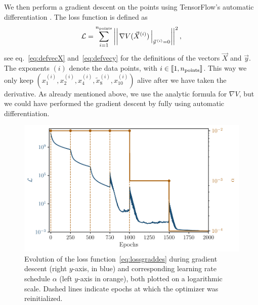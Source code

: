\documentclass[11pt,a4paper]{article}
\begin{document}
	We then perform a gradient descent on the points using TensorFlow’s automatic differentiation \cite{tensorflow2015-whitepaper}. The loss function is defined as
	\begin{equation} \label{eq:lossgraddes}
		\mathcal{L} = \sum_{i = 1}^{n_{\rm points}} \left|\left|\left.\nabla V(\vec{X}^{(i)})\,\right|_{\vec{y}^{\,(i)}=0}\right|\right|^2,
	\end{equation}
	see eq.~\eqref{eq:defvecX} and~\eqref{eq:defvecy} for the definitions of the vectors $\vec{X}$ and $\vec{y}$. The exponents $(i)$ denote the data points, with $i\in\llbracket1,n_{\rm points}\rrbracket$. This way we only keep $(x^{(i)}_1,x^{(i)}_2,x^{(i)}_4,\tilde{x}^{(i)}_8,x^{(i)}_{10})$ alive after we have taken the derivative. As already mentioned above, we use the analytic formula for $\nabla V$, but we could have performed the gradient descent by fully using automatic differentiation.

	\begin{figure}
		\centering
		\includegraphics[scale = 0.75]{Figures/Loss_grad_des_21_05_2025.pdf}
		\caption{Evolution of the loss function~\eqref{eq:lossgraddes} during gradient descent (right $y$-axis, in blue) and corresponding learning rate schedule $\alpha$ (left $y$-axis in orange), both plotted on a logarithmic scale. Dashed lines indicate epochs at which the optimizer was reinitialized.}
		\label{fig:loss_grad_des}
	\end{figure}
\end{document}
